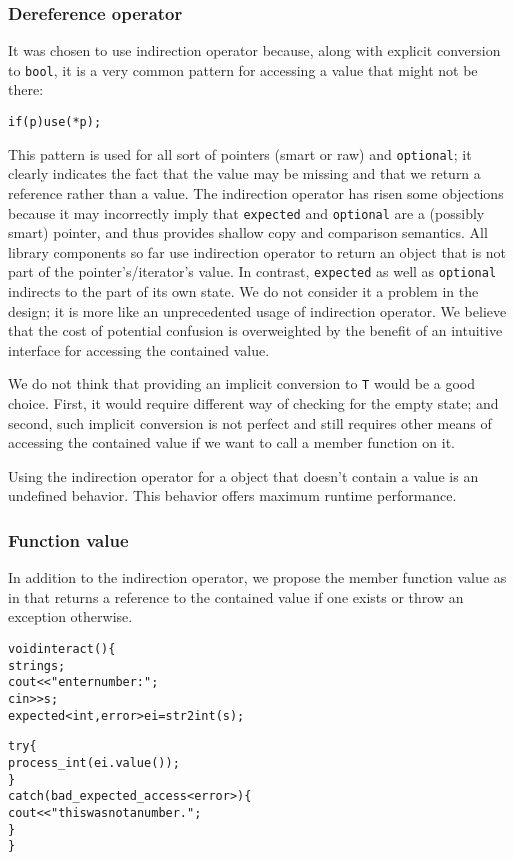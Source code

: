 \documentclass[a4paper,10pt]{article}
\newcommand{\cpp}[1]{\lstinline{#1}}
\begin{document}
\subsubsection{Dereference operator}

It was chosen to use indirection operator because, along with explicit conversion to \cpp{bool}, it is a very common pattern for accessing a value that might not be there:

\begin{alltt}
if (p) use(*p);
\end{alltt}

This pattern is used for all sort of pointers (smart or raw) and \cpp{optional}; it clearly indicates the fact that the value may be missing and that we return a reference rather than a value. The indirection operator has risen some objections because it may incorrectly imply that \cpp{expected} and \cpp{optional} are a (possibly smart) pointer, and thus provides shallow copy and comparison semantics. All library components so far use indirection operator to return an object that is not part of the pointer's/iterator's value. In contrast, \cpp{expected} as well as \cpp{optional} indirects to the part of its own state. We do not consider it a problem in the design; it is more like an unprecedented usage of indirection operator. We believe that the cost of potential confusion is overweighted by the benefit of an intuitive interface for accessing the contained value.

We do not think that providing an implicit conversion to \cpp{T} would be a good choice. First, it would require different way of checking for the empty state; and second, such implicit conversion is not perfect and still requires other means of accessing the contained value if we want to call a member function on it.

Using the indirection operator for a object that doesn't contain a value is an undefined behavior. This behavior offers maximum runtime performance.

\subsubsection{Function value}

In addition to the indirection operator, we propose the member function value as in \cite{OptionalRev4} that returns a reference to the contained value if one exists or throw an exception otherwise.

\begin{alltt}
void interact() \{
  string s;
  cout << "enter number: ";
  cin >> s;
  expected<int, error> ei = str2int(s);
  
  try \{
    process_int(ei.value());
  \}
  catch(bad_expected_access<error>) \{
    cout << "this was not a number.";
  \}
\}
\end{alltt}
\end{document}
